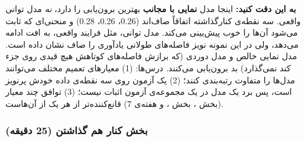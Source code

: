 \textbf{به این دقت کنید:} اینجا مدل \textbf{نمایی با مجانب} بهترین
برون‌یابی را دارد، \emph{نه} مدل توانی واقعی. سه نقطه‌ی کنارگذاشته اتفاقاً
صاف‌اند (0.26، 0.26، 0.28) و منحنی‌ای که ثابت می‌شود آن‌ها را خوب پیش‌بینی
می‌کند. مدل توانی، مثل فرایند واقعی، به افت ادامه می‌دهد، ولی در این نمونه
نویز فاصله‌های طولانی یادآوری را صاف نشان داده است. مدل نمایی خالص و مدل
دوردی (که برازش فاصله‌های کوتاهش هیچ قیدی روی جزء کند نمی‌گذارد) بد
برون‌یابی می‌کنند. درس‌ها: (1) معیارهای تعمیم مختلف می‌توانند مدل‌ها را
متفاوت رتبه‌بندی کنند؛ (2) یک آزمون روی سه نقطه‌ی داده خودش پرنویز است، پس
برد یک مدل در یک مجموعه‌ی آزمون اثبات نیست؛ (3) توافق چند معیار (بخش
، بخش ، و  هفته‌ی 7) قانع‌کننده‌تر از هر یک از
آن‌هاست.

\subsubsection{\texorpdfstring{بخش  کنار هم گذاشتن (25
دقیقه)}{بخش D: کنار هم گذاشتن (25 دقیقه)}}

